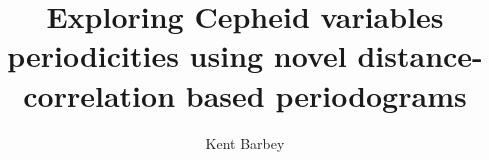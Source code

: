 \documentclass[a4paper,11pt,oneside,MScThesis]{report}
\title{Exploring Cepheid variables periodicities using novel distance-correlation based periodograms}
\author{Kent Barbey}
\begin{document}
\maketitle
\dedication{\textbf{Pumbaa}: Hey, Timon, ever wonder what those sparkly dots are up there? \\

\textbf{Timon}: Pumbaa, I don’t wonder, I know.\\

\textbf{Pumbaa}: Oh. What are they?\\

\textbf{Timon}: They’re fireflies. Fireflies that, uh… got stuck up on that big bluish-black thing.\\

\textbf{Pumbaa}: Oh, gee. I always thought they were balls of gas burning billions of miles away.\\

\textbf{Timon}: Pumbaa, with you, everything’s gas.\\

    --- \textit{The Lion King}\\}
\makededication











\cleardoublepage
{}
{}
\printbibliography
\end{document}
